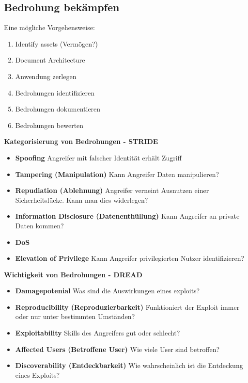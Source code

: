 \subsection{Bedrohung bekämpfen}
Eine mögliche Vorgehensweise:
\begin{enumerate}
	\item Identify assets (Vermögen?)
	\item Document Architecture
	\item Anwendung zerlegen
	\item Bedrohungen identifizieren
	\item Bedrohungen dokumentieren
	\item Bedrohungen bewerten
\end{enumerate}

\textbf{Kategorisierung von Bedrohungen - STRIDE}
\begin{itemize}
	\item \textbf{Spoofing} Angreifer mit falscher Identität erhält Zugriff
	\item \textbf{Tampering (Manipulation)} Kann Angreifer Daten manipulieren?
	\item \textbf{Repudiation (Ablehnung)} Angreifer verneint Ausnutzen einer Sicherheitslücke. Kann man dies widerlegen?
	\item \textbf{Information Disclosure (Datenenthüllung)} Kann Angreifer an private Daten kommen?
	\item \textbf{DoS}
	\item \textbf{Elevation of Privilege} Kann Angreifer privilegierten Nutzer identifizieren?
\end{itemize}

\textbf{Wichtigkeit von Bedrohungen - DREAD}
\begin{itemize}
	\item \textbf{Damagepotenial} Was sind die Auswirkungen eines exploits?
	\item \textbf{Reproducibility (Reproduzierbarkeit)} Funktioniert der Exploit immer oder nur unter bestimmten Umständen?
	\item \textbf{Exploitability} Skills des Angreifers gut oder schlecht?
	\item \textbf{Affected Users (Betroffene User)} Wie viele User sind betroffen?
	\item \textbf{Discoverability (Entdeckbarkeit)} Wie wahrscheinlich ist die Entdeckung eines Exploits?
\end{itemize} 

